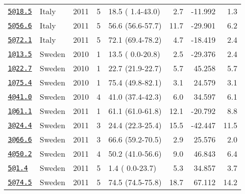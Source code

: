 \documentclass[
]{article}
\begin{document}
\begin{longtable}[]{@{}llrrlrrr@{}}
\href{mailto:5@18.5}{\nolinkurl{5@18.5}} & Italy & 2011 & 5 & 18.5 ( 1.4-43.0) & 2.7 & -11.992 & 1.3\tabularnewline
\href{mailto:5@56.6}{\nolinkurl{5@56.6}} & Italy & 2011 & 5 & 56.6 (56.6-57.7) & 11.7 & -29.901 & 6.2\tabularnewline
\href{mailto:5@72.1}{\nolinkurl{5@72.1}} & Italy & 2011 & 5 & 72.1 (69.4-78.2) & 4.7 & -18.419 & 2.4\tabularnewline
\href{mailto:1@13.5}{\nolinkurl{1@13.5}} & Sweden & 2010 & 1 & 13.5 ( 0.0-20.8) & 2.5 & -29.376 & 2.4\tabularnewline
\href{mailto:1@22.7}{\nolinkurl{1@22.7}} & Sweden & 2010 & 1 & 22.7 (21.9-22.7) & 5.7 & 45.258 & 5.7\tabularnewline
\href{mailto:1@75.4}{\nolinkurl{1@75.4}} & Sweden & 2010 & 1 & 75.4 (49.8-82.1) & 3.1 & 24.579 & 3.1\tabularnewline
\href{mailto:4@41.0}{\nolinkurl{4@41.0}} & Sweden & 2010 & 4 & 41.0 (37.4-42.3) & 6.0 & 34.597 & 6.1\tabularnewline
\href{mailto:1@61.1}{\nolinkurl{1@61.1}} & Sweden & 2011 & 1 & 61.1 (61.0-61.8) & 12.1 & -20.792 & 8.8\tabularnewline
\href{mailto:3@24.4}{\nolinkurl{3@24.4}} & Sweden & 2011 & 3 & 24.4 (22.3-25.4) & 15.5 & -42.447 & 11.5\tabularnewline
\href{mailto:3@66.6}{\nolinkurl{3@66.6}} & Sweden & 2011 & 3 & 66.6 (59.2-70.5) & 2.9 & 25.576 & 2.0\tabularnewline
\href{mailto:4@50.2}{\nolinkurl{4@50.2}} & Sweden & 2011 & 4 & 50.2 (41.0-56.6) & 9.0 & 46.843 & 6.4\tabularnewline
\href{mailto:5@1.4}{\nolinkurl{5@1.4}} & Sweden & 2011 & 5 & 1.4 ( 0.0-23.7) & 5.3 & 34.857 & 3.7\tabularnewline
\href{mailto:5@74.5}{\nolinkurl{5@74.5}} & Sweden & 2011 & 5 & 74.5 (74.5-75.8) & 18.7 & 67.112 & 14.2\tabularnewline
\bottomrule
\end{longtable}

\newpage
\end{document}
